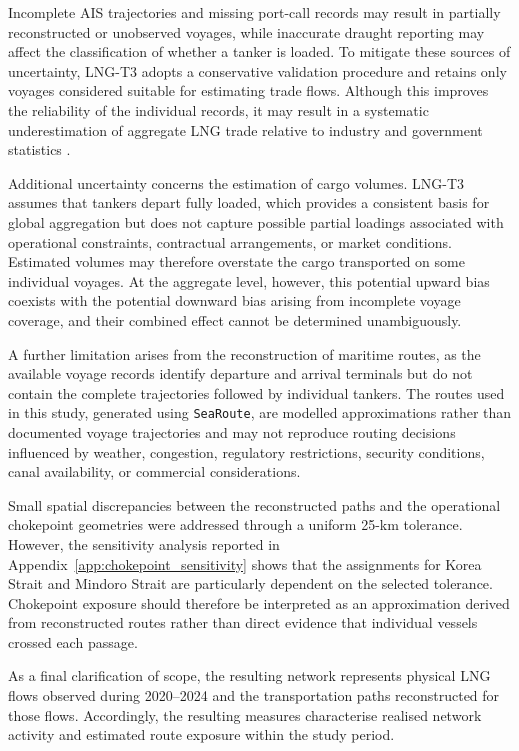 \documentclass[pdftex,12pt,openright,a4paper,oneside]{book}
\begin{document}
Incomplete AIS trajectories and missing port-call records may result in
partially reconstructed or unobserved voyages, while inaccurate draught
reporting may affect the classification of whether a tanker is loaded. To
mitigate these sources of uncertainty, LNG-T3 adopts a conservative validation
procedure and retains only voyages considered suitable for estimating trade
flows. Although this improves the reliability of the individual records, it
may result in a systematic underestimation of aggregate LNG trade relative to
industry and government statistics \citep{zhou2026}.

Additional uncertainty concerns the estimation of cargo volumes. LNG-T3 assumes
that tankers depart fully loaded, which provides a consistent basis for global
aggregation but does not capture possible partial loadings associated with
operational constraints, contractual arrangements, or market conditions.
Estimated volumes may therefore overstate the cargo transported on some
individual voyages. At the aggregate level, however, this potential upward
bias coexists with the potential downward bias arising from incomplete voyage
coverage, and their combined effect cannot be determined unambiguously.

A further limitation arises from the reconstruction of maritime routes, as the
available voyage records identify departure and arrival terminals but do not
contain the complete trajectories followed by individual tankers. The routes
used in this study, generated using \texttt{SeaRoute}, are modelled
approximations rather than documented voyage trajectories and may not reproduce
routing decisions influenced by weather, congestion, regulatory restrictions,
security conditions, canal availability, or commercial considerations.

Small spatial discrepancies between the reconstructed paths and the operational
chokepoint geometries were addressed through a uniform 25-km tolerance.
However, the sensitivity analysis reported in
Appendix~\ref{app:chokepoint_sensitivity} shows that the assignments for Korea
Strait and Mindoro Strait are particularly dependent on the selected
tolerance. Chokepoint exposure should therefore be interpreted as an
approximation derived from reconstructed routes rather than direct evidence
that individual vessels crossed each passage.

As a final clarification of scope, the resulting network represents physical
LNG flows observed during 2020--2024 and the transportation paths reconstructed
for those flows. Accordingly, the resulting measures characterise realised
network activity and estimated route exposure within the study period.
%
%
% 
\end{document}
